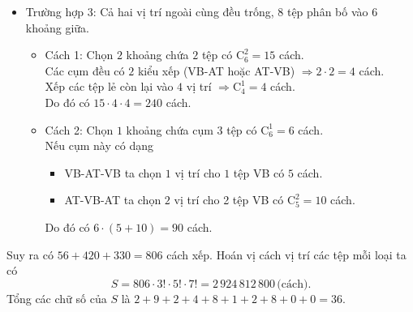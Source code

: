 \begin{ex}
{\begin{itemize}
\begin{itemize}
	 	\item  Xếp các tệp còn lại vào $6$ vị trí đơn có $\mathrm{C}_6^2 = 15$ cách.
	 \end{itemize} 
	 Tổng cộng có $2 \cdot 7 \cdot 2 \cdot 15 = 420$ cách.
	\item Trường hợp 3: Cả hai vị trí ngoài cùng đều trống, $8$ tệp phân bố vào $6$ khoảng giữa.
	 \begin{itemize}
	 	\item Cách 1: Chọn $2$ khoảng chứa $2$ tệp có $\mathrm{C}_6^2 = 15$ cách. \\
	 	Các cụm đều có $2$ kiểu xếp (VB-AT hoặc AT-VB) $\Rightarrow 2 \cdot 2 = 4$ cách.\\
	 	 Xếp các tệp lẻ còn lại vào $4$ vị trí $\Rightarrow \mathrm{C}_4^1 = 4$ cách. \\
	 	 Do đó có $15 \cdot 4 \cdot 4 = 240$ cách. 
	 	 \item Cách 2: Chọn $1$ khoảng chứa cụm $3$ tệp có $\mathrm{C}^1_6 = 6$ cách.\\
	 	 Nếu cụm này có dạng 
	 	 \begin{itemize}
	 	 	\item VB-AT-VB ta chọn $1$ vị trí cho $1$ tệp VB có $5$ cách.
	 	 	\item  AT-VB-AT ta chọn $2$ vị trí cho 2 tệp VB có $\mathrm{C}^2_5=10$ cách.
	 	 \end{itemize}
	 	 Do đó có $6 \cdot (5 + 10) = 90$ cách.
	\end{itemize}
\end{itemize}
	Suy ra có $56 + 420 + 330 = 806$ cách xếp.
	Hoán vị cách vị trí các tệp mỗi loại ta có 
	\[ S = 806 \cdot 3! \cdot 5! \cdot 7! = 2\,924\,812\,800\, \text{(cách)}. \]
	Tổng các chữ số của $S$ là $2 + 9 + 2 + 4 + 8 + 1 + 2 + 8 + 0 + 0 = 36$.
	}
\end{ex}

